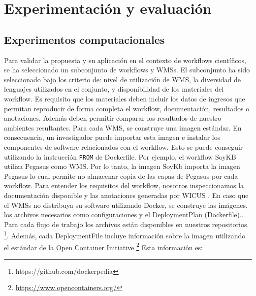 \chapter{Experimentación y evaluación}

\section{Experimentos computacionales}\label{s5.1}

Para validar la propuesta y su aplicación en el contexto de workflows científicos, se ha seleccionado un subconjunto de workflows y WMSs. 
El subconjunto ha sido seleccionado bajo los criterio de: nivel de utilización de WMS, la diversidad de lenguajes utilizados en el conjunto, y disponibilidad de los materiales del workflow. 
Es requisito que los materiales deben incluir los datos de ingresos que permitan reproducir de forma completa el workflow, documentación, resultados o anotaciones. Además deben permitir comparar los resultados de nuestro ambientes resultantes.
Para cada WMS, se construye una imagen estándar. En consecuencia, un investigador puede importar esta imagen e instalar los componentes de software relacionados con el workflow.
Esto se puede conseguir utilizando la instrucción \texttt{FROM} de Dockerfile. Por ejemplo, el workflow SoyKB utiliza Pegasus como WMS. Por lo tanto, la imagen SoyKb importa la imagen Pegasus lo cual permite no almacenar copia de las capas de Pegasus por cada workflow.
Para entender los requisitos del workflow, nosotros inspeccionamos la documentación disponible y las anotaciones generadas por WICUS \cite{santana2017reproducibility}.
En caso que el WMSs no distribuya su software utilizando Docker, se construye las imágenes, los archivos necesarios como configuraciones y el DeploymentPlan (Dockerfile)..  Para cada flujo de trabajo los archivos están disponibles en nuestros repositorios. \footnote{https://github.com/dockerpedia}.
Además, cada DeploymentFile incluye información sobre la imagen utilizando el estándar de la Open Container Initiative \footnote{\url{https://www.opencontainers.org/}} Esta información es:

